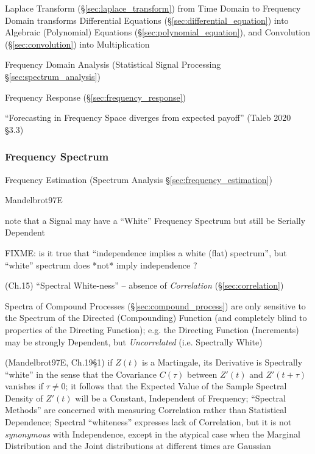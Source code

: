 Laplace Transform (\S\ref{sec:laplace_transform}) from Time Domain to Frequency
Domain transforms Differential Equations (\S\ref{sec:differential_equation})
into Algebraic (Polynomial) Equations (\S\ref{sec:polynomial_equation}), and
Convolution (\S\ref{sec:convolution}) into Multiplication

\fist Frequency Domain Analysis (Statistical Signal Processing
\S\ref{sec:spectrum_analysis})

\fist Frequency Response (\S\ref{sec:frequency_response})

``Forecasting in Frequency Space diverges from expected payoff''
(Taleb 2020 \S 3.3)



\subsubsection{Frequency Spectrum}\label{sec:frequency_spectrum}

\fist Frequency Estimation (Spectrum Analysis \S\ref{sec:frequency_estimation})

Mandelbrot97E

note that a Signal may have a ``White'' Frequency Spectrum but still be Serially
Dependent

FIXME: is it true that ``independence implies a white (flat) spectrum'',
but ``white'' spectrum does *not* imply independence ?

(Ch.15) ``Spectral White-ness'' -- absence of \emph{Correlation}
(\S\ref{sec:correlation})

Spectra of Compound Processes (\S\ref{sec:compound_process}) are only sensitive
to the Spectrum of the Directed (Compounding) Function (and completely blind to
properties of the Directing Function); e.g. the Directing Function (Increments)
may be strongly Dependent, but \emph{Uncorrelated} (i.e. Spectrally White)

(Mandelbrot97E, Ch.19\S 1) if $Z(t)$ is a Martingale, its Derivative is
Spectrally ``white'' in the sense that the Covariance $C(\tau)$ between $Z'(t)$
and $Z'(t + \tau)$ vanishes if $\tau \neq 0$; it follows that the Expected Value
of the Sample Spectral Density of $Z'(t)$ will be a Constant, Independent of
Frequency; ``Spectral Methods'' are concerned with measuring Correlation rather
than Statistical Dependence; Spectral ``whiteness'' expresses lack of
Correlation, but it is not \emph{synonymous} with Independence, except in the
atypical case when the Marginal Distribution and the Joint distributions at
different times are Gaussian

